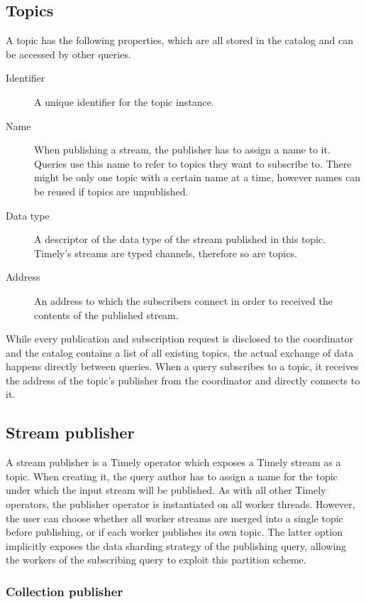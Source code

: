 \subsection{Topics}

A topic has the following properties, which are all stored in the catalog
and can be accessed by other queries.
\begin{description}
\item [Identifier] A unique identifier for the topic instance.
\item [Name] When publishing a stream, the publisher has to assign a name to it.
Queries use this name to refer to topics they want to subscribe to. There might
be only one topic with a certain name at a time, however names can be reused if
topics are unpublished.
\item [Data type] A descriptor of the data type of the stream published in this
topic. Timely's streams are typed channels, therefore so are topics.
\item [Address] An address to which the subscribers connect in order to received
the contents of the published stream.
\end{description}

While every publication and subscription request is disclosed to the coordinator
and the catalog contains a list of all existing topics, the
actual exchange of data happens directly between queries. When a query subscribes
to a topic, it receives the address of the topic's publisher from the coordinator
and directly connects to it.

\subsection{Stream publisher}

A stream publisher is a Timely operator which exposes a Timely stream as a topic. When
creating it, the query author has to assign a name for the topic under which the
input stream will be published. As with all other Timely operators, the publisher
operator is instantiated on all worker threads. However, the user can choose
whether all worker streams are merged into a single topic before publishing, or
if each worker publishes its own topic. The latter option implicitly exposes
the data sharding strategy of the publishing query, allowing the workers of
the subscribing query to exploit this partition scheme.

\subsubsection{Collection publisher}

